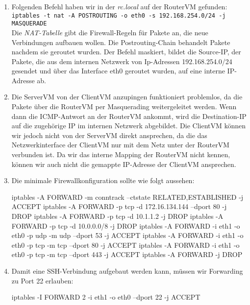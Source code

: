 \documentclass{scrartcl}
\begin{document}
\begin{enumerate}[\bfseries 1.]
	\item
        Folgenden Befehl haben wir in der \textit{rc.local} auf der RouterVM gefunden:\\
        \texttt{iptables -t nat -A POSTROUTING -o eth0 -s 192.168.254.0/24 -j MASQUERADE}\\
        Die \textit{NAT-Tabelle} gibt die Firewall-Regeln für Pakete an, die neue
        Verbindungen aufbauen wollen. Die Postrouting-Chain behandelt Pakete nachdem
        sie geroutet wurden. Der Befehl maskiert, bildet die Source-IP, der Pakete,
        die aus dem internen Netzwerk von Ip-Adressen 192.168.254.0/24 gesendet und
        über das Interface eth0 geroutet wurden, auf eine interne IP-Adresse ab.

	\item
        Die ServerVM von der ClientVM anzupingen funktioniert problemlos,
        da die Pakete über die RouterVM per Masquerading weitergeleitet werden.
        Wenn dann die ICMP-Antwort an der RouterVM ankommt, wird die Destination-IP
        auf die zugehörige IP im internen Netzwerk abgebildet.
        Die ClientVM können wir jedoch nicht von der ServerVM direkt ansprechen, da
        die das Netzwerkinterface der ClientVM nur mit dem Netz unter der RouterVM
        verbunden ist. Da wir das interne Mapping der RouterVM nicht kennen, können
        wir auch nicht die gemappte IP-Adresse der ClientVM ansprechen.

	\item
        Die minimale Firewallkonfiguration sollte wie folgt aussehen:
        \begin{rootcommands}
iptables -A FORWARD -m conntrack --ctstate RELATED,ESTABLISHED -j ACCEPT
iptables -A FORWARD -p tcp -d 172.16.134.144 --dport 80 -j DROP
iptables -A FORWARD -p tcp -d 10.1.1.2 -j DROP
iptables -A FORWARD -p tcp -d 10.0.0.0/8 -j DROP
iptables -A FORWARD -i eth1 -o eth0 -p udp -m udp --dport 53 -j ACCEPT
iptables -A FORWARD -i eth1 -o eth0 -p tcp -m tcp --dport 80 -j ACCEPT
iptables -A FORWARD -i eth1 -o eth0 -p tcp -m tcp --dport 443 -j ACCEPT
iptables -A FORWARD -j DROP
        \end{rootcommands}

	\item
        Damit eine SSH-Verbindung aufgebaut werden kann, müssen wir Forwarding zu Port
        22 erlauben:
        \begin{rootcommands}
iptables -I FORWARD 2 -i eth1 -o eth0 --dport 22 -j ACCEPT
        \end{rootcommands}


\end{enumerate}
\end{document}
